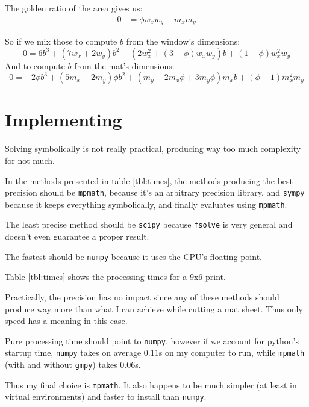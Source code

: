 \documentclass[
    paper=letter,
    parskip=half-,
    DIV=10,
]{scrartcl}
\begin{document}
    The golden ratio of the area gives us:
    \begin{align}
        0 &= \phi w_x w_y - m_x m_y
    \end{align}

    So if we mix those to compute $b$ from the window's dimensions:
    \begin{equation}\label{eq:bwin}
        0 = 6b^3 + (7w_x + 2w_y)b^2 + (2w_x^2 + (3 - \phi)w_xw_y)b + (1 - \phi)w_x^2w_y
    \end{equation}
    And to compute $b$ from the mat's dimensions:
    \begin{equation}\label{eq:bmat}
        0 = -2\phi b^3 + (5m_x + 2m_y)\phi b^2 + (m_y - 2m_x\phi + 3m_y\phi)m_xb + (\phi - 1)m_x^2m_y
    \end{equation}


\section{Implementing}

Solving symbolically is not really practical, producing way too much complexity for not much.

In the methods presented in table \ref{tbl:times}, the methods producing the best precision should be \texttt{mpmath}, because it's an arbitrary precision library, and \texttt{sympy} because it keeps everything symbolically, and finally evaluates using \texttt{mpmath}.

The least precise method should be \texttt{scipy} because \texttt{fsolve} is very general and doesn't even guarantee a proper result.

The fastest should be \texttt{numpy} because it uses the CPU's floating point.

Table \ref{tbl:times} shows the processing times for a 9x6 print.

Practically, the precision has no impact since any of these methods should produce way more than what I can achieve while cutting a mat sheet. Thus only speed has a meaning in this case.

Pure processing time should point to \texttt{numpy}, however if we account for python’s startup time, \texttt{numpy} takes on average $0.11$s on my computer to run, while \texttt{mpmath} (with and without \texttt{gmpy}) takes $0.06$s.

Thus my final choice is \texttt{mpmath}. It also happens to be much simpler (at least in virtual environments) and faster to install than \texttt{numpy}.
\end{document}
